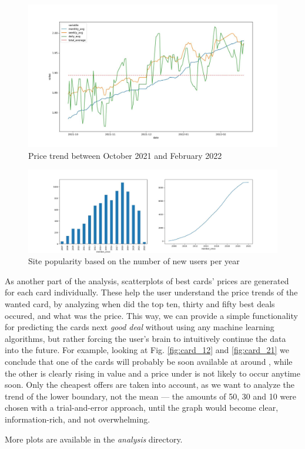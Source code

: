 \begin{figure}
    \centering
    \includegraphics[width=\textwidth]{figures/price_chart.jpg}
    \caption{Price trend between October 2021 and February 2022}
    \label{fig:price_chart}
\end{figure}

\begin{figure}
    \centering
    \includegraphics[width=\textwidth]{figures/site_popularity.jpg}
    \caption{Site popularity based on the number of new users per year}
    \label{fig:site_popularity}
\end{figure}

As another part of the analysis, scatterplots of best cards' prices are generated for each card individually. These help the user understand the price trends of the wanted card, by analyzing when did the top ten, thirty and fifty best deals occured, and what was the price. This way, we can provide a simple functionality for predicting the cards next \textit{good deal} without using any machine learning algorithms, but rather forcing the user's brain to intuitively continue the data into the future. For example, looking at Fig. \ref{fig:card_12} and \ref{fig:card_21} we conclude that one of the cards will probably be soon available at around , while the other is clearly rising in value and a price under  is not likely to occur anytime soon. Only the cheapest offers are taken into account, as we want to analyze the trend of the lower boundary, not the mean --- the amounts of 50, 30 and 10 were chosen with a trial-and-error approach, until the graph would become clear, information-rich, and not overwhelming. \par
More plots are available in the \textit{analysis} directory.

